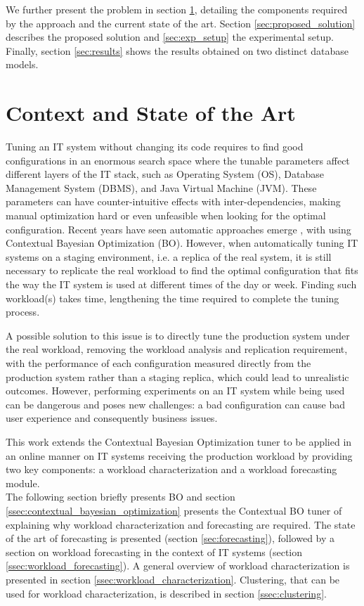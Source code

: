 \documentclass[a4paper, 12pt]{article} %
\begin{document}
	We further present the problem in section \ref{sec:context_and_state_of_the_art}, detailing the components required by the approach and the current state of the art. Section \ref{sec:proposed_solution} describes the proposed solution and \ref{sec:exp_setup} the experimental setup. Finally, section \ref{sec:results} shows the results obtained on two distinct database models.
	
	\section{ Context and State of the Art } \label{sec:context_and_state_of_the_art}
	Tuning an IT system without changing its code requires to find good configurations in an enormous search space where the tunable parameters affect different layers of the IT stack, such as Operating System (OS), Database Management System (DBMS), and Java Virtual Machine (JVM). These parameters can have counter-intuitive effects with inter-dependencies, making manual optimization hard or even unfeasible when looking for the optimal configuration. Recent years have seen automatic approaches emerge \cite{AkamasCGP, OtterTune, OtterTune2, LearningToSample}, with \cite{AkamasCGP} using Contextual Bayesian Optimization (BO). However, when automatically tuning IT systems on a staging environment, i.e. a replica of the real system, it is still necessary to replicate the real workload to find the optimal configuration that fits the way the IT system is used at different times of the day or week. Finding such workload(s) takes time, lengthening the time required to complete the tuning process.
	
	A possible solution to this issue is to directly tune the production system under the real workload, removing the workload analysis and replication requirement, with the performance of each configuration measured directly from the production system rather than a staging replica, which could lead to unrealistic outcomes. However, performing experiments on an IT system while being used can be dangerous and poses new challenges: a bad configuration can cause bad user experience and consequently business issues.
	
	This work extends the Contextual Bayesian Optimization tuner \cite{AkamasCGP} to be applied in an online manner	on IT systems receiving the production workload by providing two key components: a workload characterization and a workload forecasting module. \\
	The following section briefly presents BO and section \ref{ssec:contextual_bayesian_optimization} presents the Contextual BO tuner of \cite{AkamasCGP} explaining why workload characterization and forecasting are required. The state of the art of forecasting is presented (section \ref{sec:forecasting}), followed by a section on workload forecasting in the context of IT systems (section \ref{ssec:workload_forecasting}). A general overview of workload characterization is presented in section \ref{ssec:workload_characterization}. Clustering, that can be used for workload characterization, is described in section \ref{ssec:clustering}.
	
\end{document}
